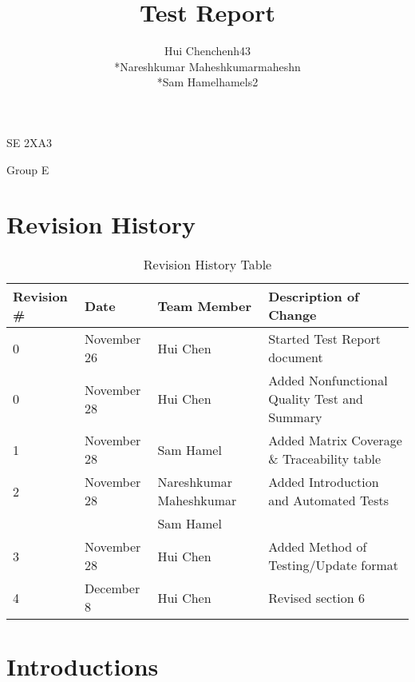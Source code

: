 \documentclass[11pt]{article}
\begin{document}
	\begin{titlepage}
	\title {Test Report}
	\maketitle
		\begin{center}
		SE 2XA3\\
		\author{
		Hui Chen\hspace{128pt}chenh43	
		\\*Nareshkumar Maheshkumar\hspace{35pt}maheshn 
		\\*Sam Hamel\hspace{118pt}hamels2 \\
		}

		Group E
		\end{center}
	\end{titlepage}
	
	\newpage
	\tableofcontents
	\listoftables
	\newpage
	
	\section{Revision History}
	\begin{table}[h]
	\caption{Revision History Table}
	\begin{tabular}{|l|l|p{3cm}|p{6cm}|}
  	\hline
  	Revision \# & Date & Team Member & Description of Change\\
  	\hline
  	0 & November 26 & Hui Chen & Started Test Report document\\
  	\hline
  	0 & November 28 & Hui Chen & Added Nonfunctional Quality Test and Summary\\
  	\hline
  	1 & November 28 & Sam Hamel & Added Matrix Coverage \& Traceability table\\
  	\hline
  	2 & November 28 & Nareshkumar Maheshkumar & Added Introduction and Automated Tests\\
  	& & Sam Hamel & \\
  	\hline
  	3 & November 28 & Hui Chen & Added Method of Testing/Update format\\
  	\hline
  	4 & December 8 & Hui Chen & Revised section 6 \\
  	\hline
	\end{tabular}
	\end{table}
	\newpage
	
	\section{Introductions}
\end{document}
